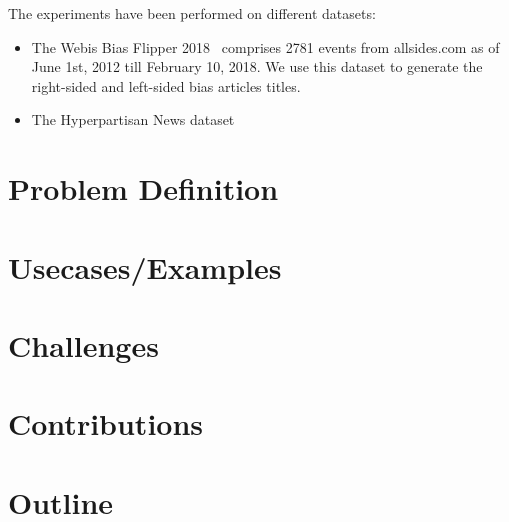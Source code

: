 The experiments have been performed on different datasets:
\begin{itemize}
  \item The Webis Bias Flipper 2018~\cite{stein:2018y} comprises 2781 events from allsides.com as of June 1st, 2012 till February 10, 2018. We use this dataset to generate
the right-sided and left-sided bias articles titles.
  \item The Hyperpartisan News dataset~\cite{johannes_kiesel_2018_1489920}
\end{itemize}
\section{Problem Definition}

\section{Usecases/Examples}

\section{Challenges}

\section{Contributions}

\section{Outline}
